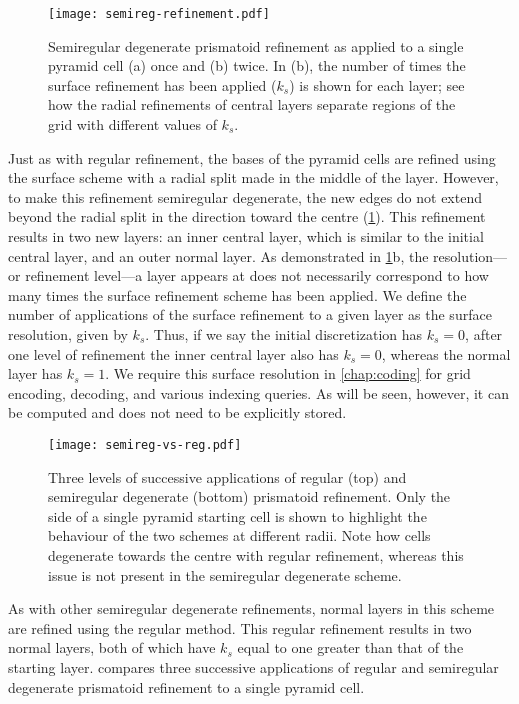 \begin{figure}[t!]
	\centering
	\texttt{[image: semireg-refinement.pdf]}
	\caption[Semiregular degenerate prismatoid refinement]{
		Semiregular degenerate prismatoid refinement as applied to a single pyramid cell (a) once and (b) twice.
		In (b), the number of times the surface refinement has been applied ($k_s$) is shown for each layer; see how the radial refinements of central layers separate regions of the grid with different values of $k_s$.
	}
	\label{fig:semiregular}
\end{figure}


Just as with regular refinement, the bases of the pyramid cells are refined using the surface scheme with a radial split made in the middle of the layer.
However, to make this refinement semiregular degenerate, the new edges do not extend beyond the radial split in the direction toward the centre (\cref{fig:semiregular}).
This refinement results in two new layers: an inner central layer, which is similar to the initial central layer, and an outer normal layer.
As demonstrated in \cref{fig:semiregular}b, the resolution---or refinement level---a layer appears at does not necessarily correspond to how many times the surface refinement scheme has been applied.
We define the number of applications of the surface refinement to a given layer as the surface resolution, given by $k_s$.
Thus, if we say the initial discretization has $k_s = 0$, after one level of refinement the inner central layer also has $k_s = 0$, whereas the normal layer has $k_s = 1$.
We require this surface resolution in \cref{chap:coding} for grid encoding, decoding, and various indexing queries. As will be seen, however, it can be computed and does not need to be explicitly stored.


\begin{figure}[ht!]
	\centering
	\texttt{[image: semireg-vs-reg.pdf]}
	\caption[Comparison of regular and semiregular degenerate prismatoid refinement]{
		Three levels of successive applications of regular (top) and semiregular degenerate (bottom) prismatoid refinement.
		Only the side of a single pyramid starting cell is shown to highlight the behaviour of the two schemes at different radii.
		Note how cells degenerate towards the centre with regular refinement, whereas this issue is not present in the semiregular degenerate scheme.
	}
	\label{fig:semireg-vs-reg}
\end{figure}


As with other semiregular degenerate refinements, normal layers in this scheme are refined using the regular method.
This regular refinement results in two normal layers, both of which have $k_s$ equal to one greater than that of the starting layer.
 compares three successive applications of regular and semiregular degenerate prismatoid refinement to a single pyramid cell.



